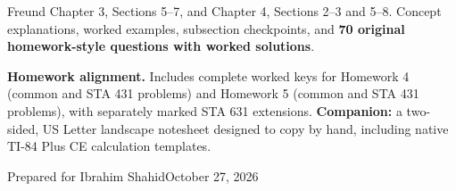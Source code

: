 \documentclass[11pt,letterpaper]{article}
\begin{document}
\begin{titlepage}
\vspace{0.3in}{\Large Multivariate distributions\par Mathematical expectation\par}
\vspace{0.45in}
\begin{insight}
Freund Chapter 3, Sections 5--7, and Chapter 4, Sections 2--3 and 5--8. Concept explanations, worked examples, subsection checkpoints, and \textbf{70 original homework-style questions with worked solutions}.
\end{insight}
\vspace{0.15in}
\textbf{Homework alignment.} Includes complete worked keys for Homework 4 (common and STA 431 problems) and Homework 5 (common and STA 431 problems), with separately marked STA 631 extensions.
\vfill
\textbf{Companion:} a two-sided, US Letter landscape notesheet designed to copy by hand, including native TI-84 Plus CE calculation templates.\par
\vspace{0.15in}Prepared for Ibrahim Shahid\hfill October 27, 2026
\end{titlepage}
\tableofcontents\clearpage

\clearpage
\clearpage
\clearpage
\clearpage
\clearpage
\clearpage
\clearpage
\clearpage
\clearpage
\clearpage
\clearpage
\clearpage
\clearpage
\end{document}

